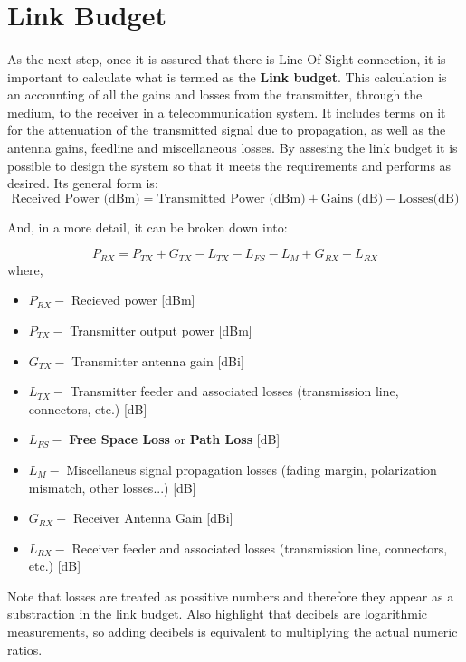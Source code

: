 \section{Link Budget}\label{subsec:link_budget}
\paragraph{}
As the next step, once it is assured that there is Line-Of-Sight connection, it is important to calculate what is termed as the \textbf{Link budget}. This calculation is an accounting of all the gains and losses from the transmitter, through the medium,  to the receiver in a telecommunication system. It includes terms on it for the attenuation of the transmitted signal due to propagation, as well as the antenna gains, feedline and miscellaneous losses. By assesing the link budget it is possible to design the system so that it meets the requirements and performs as desired. Its general form is:
\begin{equation*}\label{eq:link_budget} 
 		\text{Received Power (dBm)} = \text{Transmitted Power (dBm)} + \text{Gains (dB)} - \text{Losses(dB)}
\end{equation*}

And, in a more detail, it can be broken down into:

\begin{equation*}\label{eq:link_budget} 
 		P_{RX} = P_{TX} + G_{TX} - L_{TX} - L_{FS} - L_{M} + G_{RX} - L_{RX}
\end{equation*}
where,
\begin{itemize}
	\item{$P_{RX} -$ Recieved power [dBm]}
	\item{$P_{TX} -$ Transmitter output power [dBm]}
	\item{$G_{TX} -$ Transmitter antenna gain [dBi]}
	\item{$L_{TX} -$ Transmitter feeder and associated losses (transmission line, connectors, etc.) [dB]}
	\item{$L_{FS} -$ \textbf{Free Space Loss} or \textbf{Path Loss} [dB]}
	\item{$L_{M} -$ Miscellaneus signal propagation losses (fading margin, polarization mismatch, other losses...) [dB]} 
	\item{$G_{RX} -$ Receiver Antenna Gain [dBi]}
	\item{$L_{RX} -$ Receiver feeder and associated losses (transmission line, connectors, etc.) [dB]} 
\end{itemize}
Note that losses are treated as possitive numbers and therefore they appear as a substraction in the link budget. Also highlight that decibels are logarithmic measurements, so adding decibels is equivalent to multiplying the actual numeric ratios.
 
